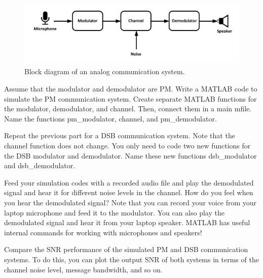 \documentclass[11pt]{article}
\begin{document}
\begin{question}

\begin{figure}[h]
\centering
\includegraphics[scale=0.8]{Fig/model.pdf}
\caption{Block diagram of an analog communication system.}\label{fig:model}
\end{figure}

\begin{subquestion}{Assume that the modulator and demodulator are PM. Write a MATLAB code to simulate the PM communication system. Create separate MATLAB functions for the modulator, demodulator, and channel. Then, connect them in a main mfile. Name the functions pm\_modulator, channel, and pm\_demodulator.
} 
\end{subquestion}

\begin{subquestion}{Repeat the previous part for a DSB communication system. Note that the channel function does not change. You only need to code two new functions for the DSB modulator and demodulator. Name these new functions dsb\_modulator and dsb\_demodulator.} 
\end{subquestion}

\begin{subquestion}{Feed your simulation codes with a recorded audio file and play the demodulated signal and hear it for different noise levels in the channel. How do you feel when you hear the demodulated signal? Note that you can record your voice from your laptop microphone and feed it to the modulator. You can also play the demodulated signal and hear it from your laptop speaker. MATLAB has useful internal commands for working with microphones and speakers!
} 
\end{subquestion}

\begin{subquestion}{Compare the SNR performance of the simulated PM and DSB communication systems. To do this, you can plot the output SNR of both systems in terms of the channel noise level, message bandwidth, and so on.
} 
\end{subquestion}


\end{question}
\end{document}
